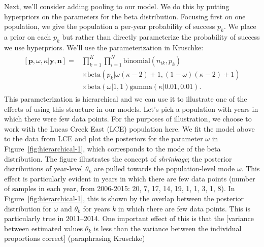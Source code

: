 \documentclass[12pt, oneside, titlepage]{article}   	%
\begin{document}
Next, we'll consider adding pooling to our model. We do this by putting hyperpriors on the parameters for the beta distribution. Focusing first on one population, we give the population a per-year probability of success $p_k$. We place a prior on each $p_{k}$ but rather than directly parameterize the probability of success we use hyperpriors. We'll use the parameterization in Kruschke:
%
\begin{align}
  \begin{split}
[\bm{p},\omega,\kappa|\bm{y},\bm{n}]  = & \prod_{k=1}^K\prod_{i=1}^N \mathrm{binomial}(n_{ik},p_{k}) 
    \\ & \times \mathrm{beta} (  p_{k} | \omega(\kappa-2) +1 , (1-\omega) (\kappa -2) + 1) 
    \\ & \times \mathrm{beta} ( \omega | 1, 1) \mathrm{gamma} ( \kappa | 0.01, 0.01)  .
  \end{split}
\end{align}
%
This parameterization is hierarchical and we can use it to illustrate one of the effects of using this structure in our models. Let's pick a population with years in which there were few data points. For the purposes of illustration, we choose to work with the Lucas Creek East (LCE) population here. We fit the model above to the data from LCE and plot the posteriors for the parameter $\omega$ in Figure~\ref{fig:hierarchical-1}, which corresponds to the mode of the beta distribution. The figure illustrates the concept of \textit{shrinkage}; the posterior distributions of year-level $\theta_k$ are pulled towards the population-level mode $\omega$. This effect is particularly evident in years in which there are few data points (number of samples in each year, from 2006-2015: 20, 7, 17, 14, 19, 1, 1, 3, 1, 8). In Figure~\ref{fig:hierarchical-1}, this is shown by the overlap between the posterior distribution for $\omega$ and $\theta_k$ for years $k$ in which there are few data points. This is particularly true in 2011--2014. One important effect of this is that the [variance between estimated values $\theta_k$ is less than the variance between the individual proportions correct] (paraphrasing Kruschke)
\end{document}

